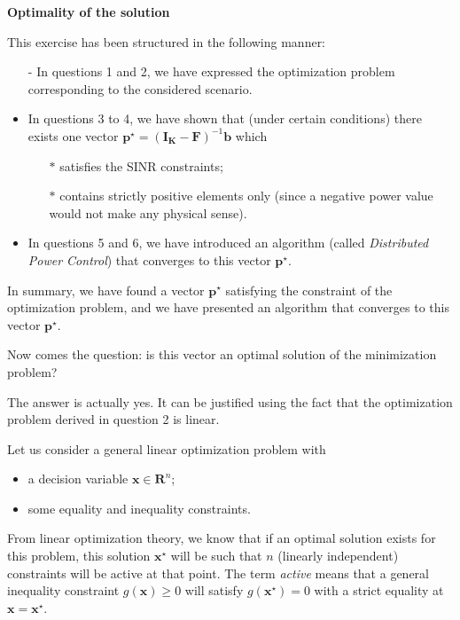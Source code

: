 \documentclass [a4paper, 11pt] {article}
\begin{document}
\begin{solution}
\begin{enumerate}
    
    
    \textbf{Optimality of the solution}
    
    This exercise has been structured in the following manner: 
    
    \begin{itemize}
        \item[-] In questions 1 and 2, we have expressed the optimization problem corresponding to the considered scenario.
        \item In questions 3 to 4, we have shown that (under certain conditions) there exists one vector $\mathbf{p}^\star = (\mathbf{I_K} - \mathbf{F})^{-1}\mathbf{b}$ which 
        \begin{itemize}
            \item[$\ast$] satisfies the SINR constraints;
            \item[$\ast$] contains strictly positive elements only (since a negative power value would not make any physical sense).
        \end{itemize}
         \item In questions 5 and 6, we have introduced an algorithm (called \textit{Distributed Power Control}) that converges to this vector $\mathbf{p}^\star$.
    \end{itemize}
    
    In summary, we have found a vector $\mathbf{p}^\star$ satisfying the constraint of the optimization problem, and we have presented an algorithm that converges to this vector $\mathbf{p}^\star$. 
    
    Now comes the question: is this vector an optimal solution of the minimization problem?
    
    The answer is actually yes. It can be justified using the fact that the optimization problem derived in question 2 is linear. 
    
    Let us consider a general linear optimization problem with
    \begin{itemize}
        \item a decision variable $\mathbf{x} \in \mathbf{R}^n$;
        \item some equality and inequality constraints.
    \end{itemize}
    
    
    
    \newpage
        
    
    
    From linear optimization theory, we know that if an optimal solution exists for this problem, this solution $\mathbf{x}^\star$ will be such that $n$ (linearly independent) constraints will be active at that point. The term \textit{active} means that a general inequality constraint $g(\mathbf{x}) \geq 0$ will satisfy $g(\mathbf{x}^\star) = 0$ with a strict equality at $\mathbf{x} = \mathbf{x}^\star$.
    

\end{enumerate}
\end{solution}
\end{document}
